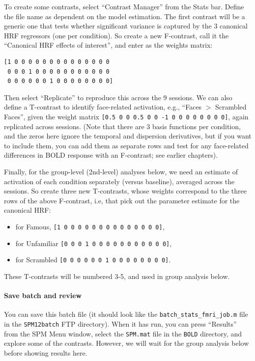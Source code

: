To create some contrasts, select ``Contrast Manager'' from the Stats bar. Define the file name as dependent on the model estimation. The first contrast will be a generic one that tests whether significant variance is captured by the 3 canonical HRF regressors (one per condition). So create a new F-contrast, call it the ``Canonical HRF effects of interest'', and enter as the weights matrix:
\begin{verbatim}
[1 0 0 0 0 0 0 0 0 0 0 0 0 0 0
 0 0 0 1 0 0 0 0 0 0 0 0 0 0 0
 0 0 0 0 0 0 1 0 0 0 0 0 0 0 0]
\end{verbatim}
Then select ``Replicate'' to reproduce this across the 9 sessions. We can also define a T-contrast to identify face-related activation, e.g., ``Faces \(>\) Scrambled Faces'', given the weight matrix \texttt{[0.5 0 0  0.5 0 0  -1 0 0  0 0 0 0 0 0]}, again replicated across sessions. (Note that there are 3 basis functions per condition, and the zeros here ignore the temporal and dispersion derivatives, but if you want to include them, you can add them as separate rows and test for any face-related differences in BOLD response with an F-contrast; see earlier chapters).

Finally, for the group-level (2nd-level) analyses below, we need an estimate of activation of each condition separately (versus baseline), averaged across the sessions. So create three new T-contrasts, whose weights correspond to the three rows of the above F-contrast, i.e, that pick out the parameter estimate for the canonical HRF:

\begin{itemize}
	\item[] for Famous, \texttt{[1 0 0  0 0 0  0 0 0  0 0 0 0 0 0]},
	\item[] for Unfamiliar \texttt{[0 0 0  1 0 0  0 0 0  0 0 0 0 0 0]},
	\item[] for Scrambled \texttt{[0 0 0  0 0 0  1 0 0  0 0 0 0 0 0]}.
\end{itemize}

These T-contrasts will be numbered 3-5, and used in group analysis below.

\paragraph{Save batch and review}

You can save this batch file (it should look like the \texttt{batch\_stats\_fmri\_job.m} file in the \texttt{SPM12batch} FTP directory). When it has run, you can press ``Results'' from the SPM Menu window, select the \texttt{SPM.mat} file in the \texttt{BOLD} directory, and explore some of the contrasts. However, we will wait for the group analysis below before showing results here.

